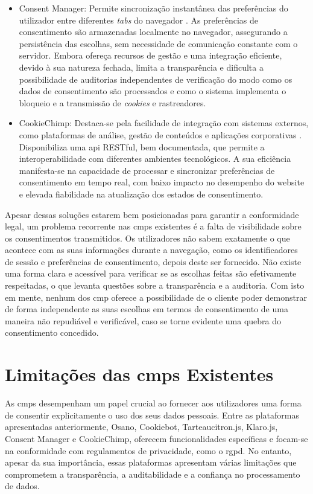 \begin{itemize}
    \item Consent Manager: Permite sincronização instantânea das preferências do utilizador entre diferentes \textit{tabs} do navegador \cite{ConsentManager2024}. As preferências de consentimento são armazenadas localmente no navegador, assegurando a persistência das escolhas, sem necessidade de comunicação constante com o servidor. Embora ofereça recursos de gestão e uma integração eficiente, devido à sua natureza fechada, limita a transparência e dificulta a possibilidade de auditorias independentes de verificação do modo como os dados de consentimento são processados e como o sistema implementa o bloqueio e a transmissão de \textit{cookies} e rastreadores.

    \item CookieChimp: Destaca-se pela facilidade de integração com sistemas externos, como plataformas de análise, gestão de conteúdos e aplicações corporativas \cite{CookieChimp2024}. Disponibiliza uma \acrshort{api} RESTful, bem documentada, que permite a interoperabilidade com diferentes ambientes tecnológicos. A sua eficiência manifesta-se na capacidade de processar e sincronizar preferências de consentimento em tempo real, com baixo impacto no desempenho do website e elevada fiabilidade na atualização dos estados de consentimento.
\end{itemize}

Apesar dessas soluções estarem bem posicionadas para garantir a conformidade legal, um problema recorrente nas \acrshort{cmp}s existentes é a falta de visibilidade sobre os consentimentos transmitidos. Os utilizadores não sabem exatamente o que acontece com as suas informações durante a navegação, como os identificadores de sessão e preferências de consentimento, depois deste ser fornecido. Não existe uma forma clara e acessível para verificar se as escolhas feitas são efetivamente respeitadas, o que levanta questões sobre a transparência e a auditoria. Com isto em mente, nenhum dos \acrshort{cmp} oferece a possibilidade de o cliente poder demonstrar de forma independente as suas escolhas em termos de consentimento de uma maneira não repudiável e verificável, caso se torne evidente uma quebra do consentimento concedido.


\section{Limitações das \acrshort{cmp}s Existentes}

As \acrshort{cmp}s desempenham um papel crucial ao fornecer aos utilizadores uma forma de consentir explicitamente o uso dos seus dados pessoais. Entre as plataformas apresentadas anteriormente, Osano, Cookiebot, Tarteaucitron.js, Klaro.js, Consent Manager e CookieChimp, oferecem funcionalidades específicas e focam-se na conformidade com regulamentos de privacidade, como o \acrshort{rgpd}. No entanto, apesar da sua importância, essas plataformas apresentam várias limitações que comprometem a transparência, a auditabilidade e a confiança no processamento de dados.

